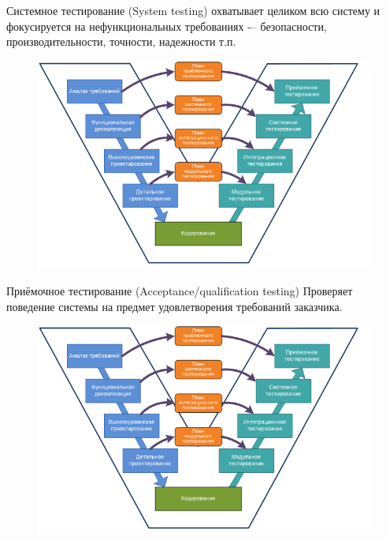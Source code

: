 \documentclass[xcolor=table]{beamer}
\begin{document}
\begin{frame}{Системное тестирование (System testing)}
	охватывает целиком всю систему и фокусируется на нефункциональных требованиях -– безопасности, производительности, точности, надежности т.п.  
	\begin{figure}[h]
		\centering
		\includegraphics[scale=0.6]{images/testing-levels.png}
	\end{figure}
\end{frame}

\begin{frame}{Приёмочное тестирование (Acceptance/qualification testing)}
	Проверяет поведение системы на предмет удовлетворения требований заказчика. 
	\begin{figure}[h]
		\centering
		\includegraphics[scale=0.6]{images/testing-levels.png}
	\end{figure}
\end{frame}
\end{document}
